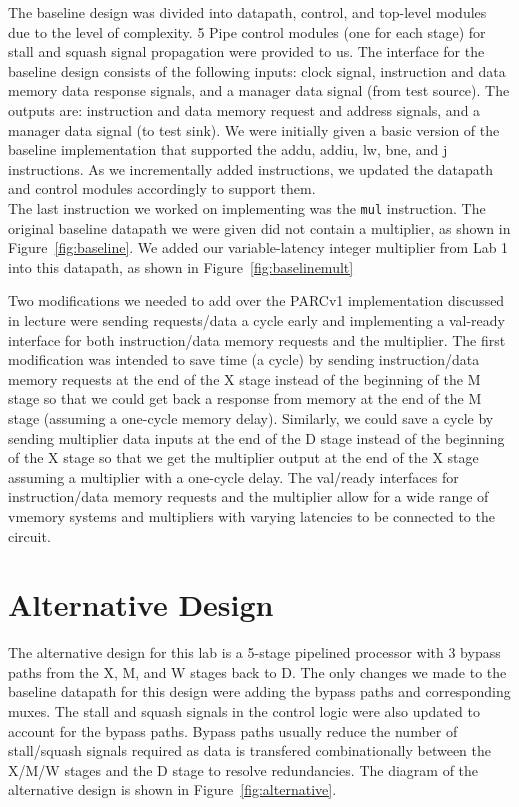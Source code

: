 \documentclass[10pt]{article}
\begin{document}
The baseline design was divided into datapath, control, and top-level modules due to the level of complexity. 5 Pipe control modules (one for each stage) for stall and squash signal propagation were provided to us. The interface for the baseline design consists of the following inputs: clock signal, instruction and data memory data response signals, and a manager data signal (from test source). The outputs are: instruction and data memory request and address signals, and a manager data signal (to test sink). We were initially given a basic version of the baseline implementation that supported the addu, addiu, lw, bne, and j instructions. As we incrementally added instructions, we updated the datapath and control modules accordingly to support them. \\

The last instruction we worked on implementing was the \texttt{mul} instruction. The original baseline datapath we were given did not contain a multiplier, as shown in Figure~\ref{fig:baseline}. We added our variable-latency integer multiplier from Lab 1 into this datapath, as shown in Figure~\ref{fig:baselinemult}

Two modifications we needed to add over the PARCv1 implementation discussed in lecture were sending requests/data a cycle early and implementing a val-ready interface for both instruction/data memory requests and the multiplier. The first modification was intended to save time (a cycle) by sending instruction/data memory requests at the end of the X stage instead of the beginning of the M stage so that we could get back a response from memory at the end of the M stage (assuming a one-cycle memory delay). Similarly, we could save a cycle by sending multiplier data inputs at the end of the D stage instead of the beginning of the X stage so that we get the multiplier output at the end of the X stage assuming a multiplier with a one-cycle delay. The val/ready interfaces for instruction/data memory requests and the multiplier allow for a wide range of vmemory systems and multipliers with varying latencies to be connected to the circuit. 


\section{Alternative Design}

The alternative design for this lab is a 5-stage pipelined processor with 3 bypass paths from the X, M, and W stages back to D. The only changes we made to the baseline datapath for this design were adding the bypass paths and corresponding muxes. The stall and squash signals in the control logic were also updated to account for the bypass paths. Bypass paths usually reduce the number of stall/squash signals required as data is transfered combinationally between the X/M/W stages and the D stage to resolve redundancies. The diagram of the alternative design is shown in Figure~\ref{fig:alternative}. \\
\end{document}
